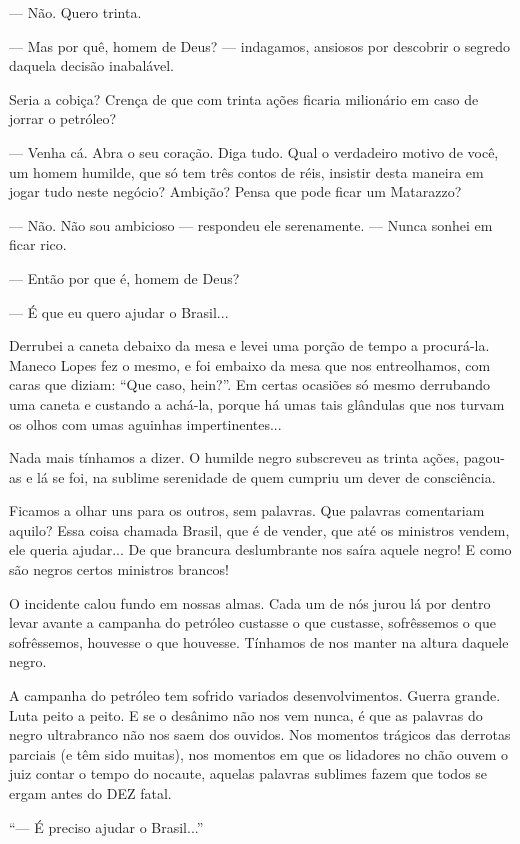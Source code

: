 --- Não. Quero trinta.

--- Mas por quê, homem de Deus? --- indagamos, ansiosos por descobrir o
segredo daquela decisão inabalável.

Seria a cobiça? Crença de que com trinta ações ficaria milionário em
caso de jorrar o petróleo?

--- Venha cá. Abra o seu coração. Diga tudo. Qual o verdadeiro motivo de
você, um homem humilde, que só tem três contos de réis, insistir desta
maneira em jogar tudo neste negócio? Ambição? Pensa que pode ficar um
Matarazzo?

--- Não. Não sou ambicioso --- respondeu ele serenamente. --- Nunca
sonhei em ficar rico.

--- Então por que é, homem de Deus?

--- É que eu quero ajudar o Brasil...

Derrubei a caneta debaixo da mesa e levei uma porção de tempo a
procurá-la. Maneco Lopes fez o mesmo, e foi embaixo da mesa que nos
entreolhamos, com caras que diziam: ``Que caso, hein?''. Em certas
ocasiões só mesmo derrubando uma caneta e custando a achá-la, porque há
umas tais glândulas que nos turvam os olhos com umas aguinhas
impertinentes...

Nada mais tínhamos a dizer. O humilde negro subscreveu as trinta ações,
pagou-as e lá se foi, na sublime serenidade de quem cumpriu um dever de
consciência.

Ficamos a olhar uns para os outros, sem palavras. Que palavras
comentariam aquilo? Essa coisa chamada Brasil, que é de vender, que até
os ministros vendem, ele queria ajudar... De que brancura deslumbrante
nos saíra aquele negro! E como são negros certos ministros brancos!

O incidente calou fundo em nossas almas. Cada um de nós jurou lá por
dentro levar avante a campanha do petróleo custasse o que custasse,
sofrêssemos o que sofrêssemos, houvesse o que houvesse. Tínhamos de nos
manter na altura daquele negro.

A campanha do petróleo tem sofrido variados desenvolvimentos. Guerra
grande. Luta peito a peito. E se o desânimo não nos vem nunca, é que as
palavras do negro ultrabranco não nos saem dos ouvidos. Nos momentos
trágicos das derrotas parciais (e têm sido muitas), nos momentos em que
os lidadores no chão ouvem o juiz contar o tempo do nocaute, aquelas
palavras sublimes fazem que todos se ergam antes do DEZ fatal.

``--- É preciso ajudar o Brasil...''

